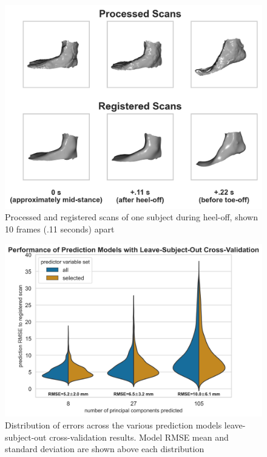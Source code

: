 \documentclass[preprint]{elsarticle}
\begin{document}
\newpage

\begin{figure}
\hypertarget{fig:scans}{%
\centering
\includegraphics[width=1\textwidth,height=\textheight]{fig/Fig3.png}
\caption{Processed and registered scans of one subject during heel-off, shown 10 frames (.11 seconds) apart}\label{fig:scans}
}
\end{figure}

\newpage

\begin{figure}
\hypertarget{fig:modelperf}{%
\centering
\includegraphics[width=1\textwidth,height=\textheight]{fig/Fig4.png}
\caption{Distribution of errors across the various prediction models leave-subject-out cross-validation results. Model RMSE mean and standard deviation are shown above each distribution}\label{fig:modelperf}
}
\end{figure}
\end{document}
